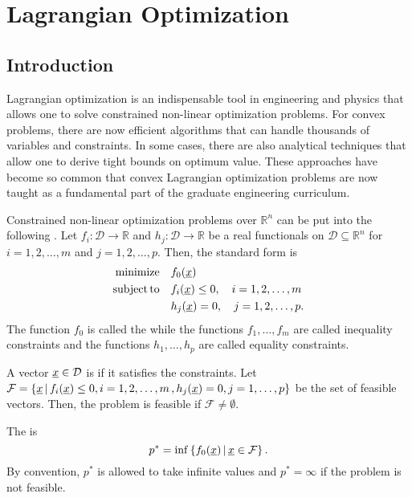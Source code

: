 \chapter{Lagrangian Optimization}

\section{Introduction}

Lagrangian optimization is an indispensable tool in engineering and physics that allows one to solve constrained non-linear optimization problems.
For convex problems, there are now efficient algorithms that can handle thousands of variables and constraints.
In some cases, there are also analytical techniques that allow one to derive tight bounds on optimum value.
These approaches have become so common that convex Lagrangian optimization problems are now taught as a fundamental part of the graduate engineering curriculum.

Constrained non-linear optimization problems over $\mathbb{R}^n$ can be put into the following .
Let $f_i : \mathcal{D} \rightarrow \mathbb{R}$ and $h_j : \mathcal{D} \rightarrow \mathbb{R}$ be a real functionals on $\mathcal{D} \subseteq \mathbb{R}^n$ for $i=1,2,\ldots,m$ and $j=1,2,\ldots,p$.
Then, the standard form is
\begin{align*}
\mathrm{minimize} \quad & f_0 (\underline{x}) \\
\mathrm{subject\,to} \quad & f_i (\underline{x}) \leq 0, \quad i=1,2,\ldots,m \\
& h_j (\underline{x}) = 0, \quad j=1,2,\ldots,p.
\end{align*}
The function $f_0$ is called the  while the functions $f_1,\ldots,f_m$ are called inequality constraints and the functions $h_1,\ldots,h_p$ are called equality constraints.

\begin{definition}
A vector $\underline{x} \in \mathcal{D}$ is  if it satisfies the constraints.
Let $\mathcal{F} = \{ \underline{x} \, | \,  f_i (\underline{x}) \leq 0, i=1,2,\ldots,m \, , h_j (\underline{x}) = 0, j=1,\ldots,p \}$ be the set of feasible vectors.
Then, the problem is feasible if $\mathcal{F} \neq \emptyset$.
\end{definition}

\begin{definition}
The  is
\[ p^* = \inf \left\{ f_0 (\underline{x}) \, | \, \underline{x} \in \mathcal{F} \right\}. \]
By convention, $p^*$ is allowed to take infinite values and $p^* = \infty$ if the problem is not feasible.
\end{definition}

